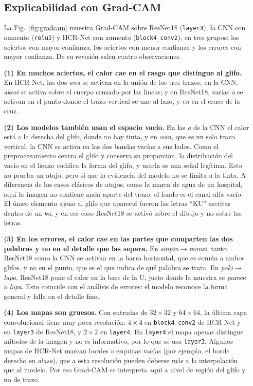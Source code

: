 \documentclass[conference]{IEEEtran}
\begin{document}
\subsection{Explicabilidad con Grad-CAM}
La Fig.~\ref{fig:gradcam} muestra Grad-CAM \cite{selvaraju_gradcam_2017}
sobre ResNet18 (\texttt{layer3}), la CNN con aumento (\texttt{relu3}) y
HCR-Net con aumento (\texttt{block4\_conv2}), en tres grupos: los aciertos con
mayor confianza, los aciertos con menor confianza y los errores con mayor
confianza. De su revisión salen cuatro observaciones.

\textbf{(1) En muchos aciertos, el calor cae en el rasgo que distingue al
glifo.} En HCR-Net, las dos \textit{anu} se activan en la unión de los tres
trazos; en la CNN, \textit{akesi} se activa sobre el cuerpo cruzado por las
líneas; y en ResNet18, varias \textit{a} se activan en el punto donde el
trazo vertical se une al lazo, y \textit{en} en el cruce de la cruz.

\textbf{(2) Los modelos también usan el espacio vacío.} En las \textit{a}
de la CNN el calor está a la derecha del glifo, donde no hay tinta, y en
\textit{wan}, que es un solo trazo vertical, la CNN se activa en las dos
bandas vacías a sus lados. Como el preprocesamiento centra el glifo y
conserva su proporción, la distribución del vacío en el lienzo codifica la
forma del glifo, y usarla es una señal legítima. Esto no prueba un atajo,
pero sí que la evidencia del modelo no se limita a la tinta. A diferencia de
los casos clásicos de atajos, como la marca de agua de un hospital, aquí la
imagen no contiene nada aparte del trazo: el fondo es el canal alfa vacío.
El único elemento ajeno al glifo que apareció fueron las letras ``KU''
escritas dentro de un \textit{ku}, y en ese caso ResNet18 se activó sobre el
dibujo y no sobre las letras.

\textbf{(3) En los errores, el calor cae en las partes que comparten las dos
palabras y no en el detalle que las separa.} En \textit{sinpin}$\to$\textit{monsi},
tanto ResNet18 como la CNN se activan en la barra horizontal, que es común a
ambos glifos, y no en el punto, que es el que indica de qué palabra se trata.
En \textit{poki}$\to$\textit{lupa}, ResNet18 pone el calor en la base de la U, justo
donde la muestra se parece a \textit{lupa}. Esto coincide con el análisis de
errores: el modelo reconoce la forma general y falla en el detalle fino.

\textbf{(4) Los mapas son gruesos.} Con entradas de $32\times32$ y
$64\times64$, la última capa convolucional tiene muy poca resolución:
$4\times4$ en \texttt{block4\_conv2} de HCR-Net y en \texttt{layer3} de
ResNet18, y $2\times2$ en \texttt{layer4}. En \texttt{layer4} el mapa apenas
distingue mitades de la imagen y no es informativo, por lo que se usa
\texttt{layer3}. Algunos mapas de HCR-Net marcan bordes o esquinas vacías
(por ejemplo, el borde derecho en \textit{alasa}), que a esta resolución
pueden deberse más a la interpolación que al modelo. Por eso Grad-CAM se
interpreta aquí a nivel de región del glifo y no de trazo.
\end{document}
